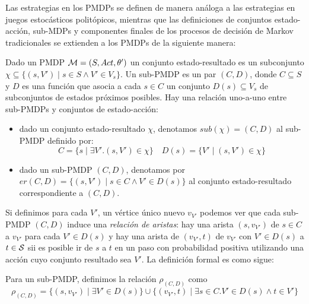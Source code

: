 Las estrategias en los PMDPs se definen de manera análoga a las estrategias en
juegos estocásticos politópicos, mientras que las definiciones de conjuntos
estado-acción, sub-MDPs y componentes finales de los procesos de decisión de
Markov tradicionales se extienden a los PMDPs de la siguiente manera:

\begin{definition}
	Dado un PMDP $\mathcal{M} = (S, Act, \theta')$ un conjunto estado-resultado es un subconjunto $\chi \subseteq \{(s, V') \mid s \in S \wedge V' \in V_s\}$. Un sub-PMDP es un par $(C, D)$, donde $C \subseteq S$ y $D$ es una función que asocia a cada $s \in C$ un conjunto $D(s) \subseteq V_s$ de subconjuntos de estados próximos posibles. Hay una relación uno-a-uno entre sub-PMDPs y conjuntos de estado-acción:

	\begin{itemize}
		\item dado un conjunto estado-resultado $\chi$, denotamos $sub(\chi) = (C, D)$ al
		      sub-PMDP definido por:
		      \[
			      C = \{s \mid \exists V' . (s, V') \in \chi\} \quad D(s) = \{V' \mid (s, V') \in \chi\}
		      \]

		\item dado un sub-PMDP $(C, D)$, denotamos por $er(C,D) = \{(s,V') \mid s \in C
			      \wedge V' \in D(s)\}$ al conjunto estado-resultado correspondiente a $(C, D)$.
	\end{itemize}
\end{definition}

Si definimos para cada $V'$, un vértice único nuevo $v_{V'}$ podemos ver que
cada sub-PMDP $(C, D)$ induce una \textit{relación de aristas}: hay una arista
$(s, v_{V'})$ de $s \in C$ a $v_{V'}$ para cada $V' \in D(s)$ y hay una arista
de $(v_{V'}, t)$ de $v_{V'}$ con $V' \in D(s)$ a $t \in \mathcal{S}$ sii es posible ir
de $s$ a $t$ en un paso con probabilidad positiva utilizando una acción cuyo
conjunto resultado sea $V'$. La definición formal es como sigue:

\begin{definition}
	Para un sub-PMDP, definimos la relación $\rho_{(C,D)}$ como
	\[
		\rho_{(C,D)} = \{(s, v_{V'}) \mid \exists V' \in D(s)\} \cup \{(v_{V'}, t) \mid \exists s \in C . V' \in D(s) \wedge t \in V' \}
	\]
\end{definition}

